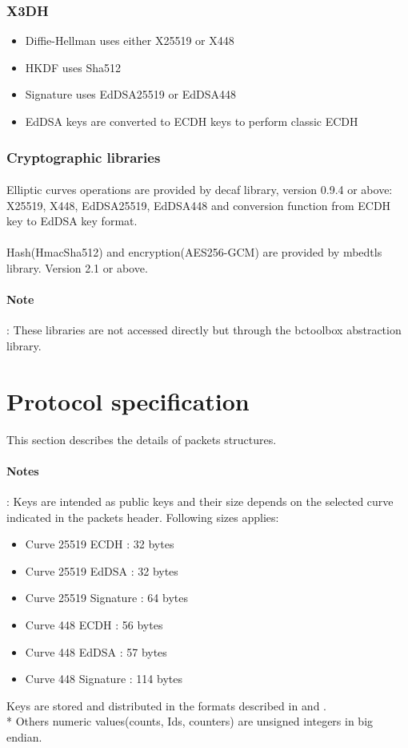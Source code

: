 \documentclass[a4paper,11pt]{article}
\begin{document}
    \subsubsection{X3DH}
      \begin{itemize}
        \item Diffie-Hellman uses either X25519 or X448
        \item HKDF uses Sha512
        \item Signature uses EdDSA25519 or EdDSA448
        \item EdDSA keys are converted to ECDH keys to perform classic ECDH
      \end{itemize}
  
  \subsubsection{Cryptographic libraries}
    \paragraph{}Elliptic curves operations are provided by decaf library\cite{libdecaf}, version 0.9.4 or above: X25519, X448, EdDSA25519, EdDSA448 and conversion function from ECDH key to EdDSA key format.
    \paragraph{}Hash(HmacSha512) and encryption(AES256-GCM) are provided by mbedtls library\cite{libmbedtls}. Version 2.1 or above.
    \paragraph{Note}: These libraries are not accessed directly but through the bctoolbox abstraction library.

\section{Protocol specification}
  This section describes the details of packets structures.
  \paragraph*{Notes}: Keys are intended as public keys and their size depends on the selected curve indicated in the packets header. Following sizes applies:
  \begin{itemize}
    \item Curve 25519 ECDH : 32 bytes
    \item Curve 25519 EdDSA : 32 bytes
    \item Curve 25519 Signature : 64 bytes
    \item Curve 448 ECDH : 56 bytes
    \item Curve 448 EdDSA : 57 bytes
    \item Curve 448 Signature : 114 bytes
  \end{itemize}
  Keys are stored and distributed in the formats described in \cite{rfc7748} and \cite{rfc8032}.\\*
  Others numeric values(counts, Ids, counters) are unsigned integers in big endian.
  
\end{document}
